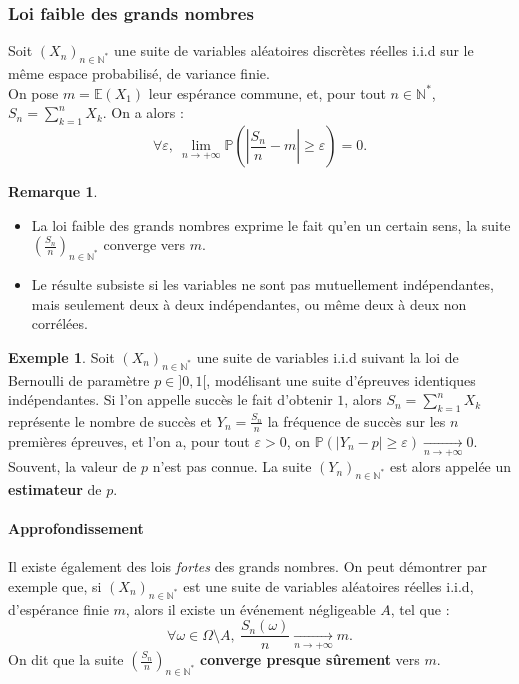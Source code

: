 \documentclass[french]{article}
\renewcommand{\P}{\mathbb{P}}
\newcommand{\N}{\mathbb{N}}
\newcommand{\st}{^*}
\newcommand{\E}{\mathbb{E}}
\theoremstyle{plain}
\theoremstyle{definition}
\newtheorem*{ex}{Exemple}
\newtheorem*{rmq}{Remarque}
\theoremstyle{remark}
\begin{document}
\subsubsection*{Loi faible des grands nombres}

\begin{thm}
	Soit $(X_n)_{n\in\N\st}$ une suite de variables aléatoires discrètes réelles i.i.d sur le même espace probabilisé, de variance finie. \\
	On pose $m=\E(X_1)$ leur espérance commune, et, pour tout $n\in\N\st$, $S_n=\displaystyle\sum_{k=1}^{n}X_k$. On a alors :
	$$\forall\varepsilon,\ \underset{n\to+\infty}{\lim}\P\left(\left\lvert\frac{S_n}{n}-m\right\rvert\geqslant\varepsilon\right)=0.$$
\end{thm}

\begin{rmq}
	\begin{itemize}
		\item La loi faible des grands nombres exprime le fait qu'en un certain sens, la suite $\displaystyle\left(\frac{S_n}{n}\right)_{n\in\N\st}$ converge vers $m$.
		\item Le résulte subsiste si les variables ne sont pas mutuellement indépendantes, mais seulement deux à deux indépendantes, ou même deux à deux non corrélées.
	\end{itemize}
\end{rmq}

\begin{ex}
	Soit $(X_n)_{n\in\N\st}$ une suite de variables i.i.d suivant la loi de Bernoulli de paramètre $p\in]0,1[$, modélisant une suite d'épreuves identiques indépendantes. Si l'on appelle succès le fait d'obtenir $1$, alors $S_n=\displaystyle\sum_{k=1}^{n}X_k$ représente le nombre de succès et $Y_n=\displaystyle\frac{S_n}{n}$ la fréquence de succès sur les $n$ premières épreuves, et l'on a, pour tout $\varepsilon>0$, on $\P(\lvert Y_n-p\rvert\geqslant\varepsilon)\xrightarrow[n\to+\infty]{}0$. \\
	Souvent, la valeur de $p$ n'est pas connue. La suite $(Y_n)_{n\in\N\st}$ est alors appelée un \textbf{estimateur} de $p$.
\end{ex}

\paragraph{Approfondissement} Il existe également des lois \textit{fortes} des grands nombres. On peut démontrer par exemple que, si $(X_n)_{n\in\N\st}$ est une suite de variables aléatoires réelles i.i.d, d'espérance finie $m$, alors il existe un événement négligeable $A$, tel que :
$$\forall\omega\in\Omega\setminus A,\ \frac{S_n(\omega)}{n}\xrightarrow[n\to+\infty]{}m.$$
On dit que la suite $\displaystyle\left(\frac{S_n}{n}\right)_{n\in\N\st}$ \textbf{converge presque sûrement} vers $m$.
\end{document}
